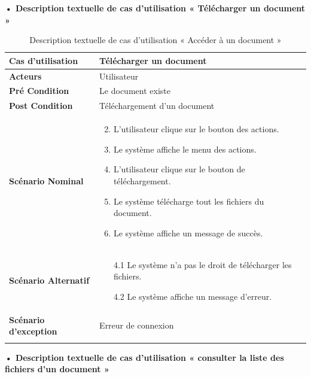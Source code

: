 \textbf{•	Description textuelle de cas d'utilisation « Télécharger un document »}

\begin{longtable}{|p{5cm}|p{10cm}|}
\hline
\textbf{Cas d'utilisation}& Télécharger un document\\
\hline
\textbf{Acteurs}&Utilisateur\\
\hline
\textbf{Pré Condition}&Le document existe\\
\hline
\textbf{Post Condition}&Téléchargement d'un document\\
\hline
\textbf{Scénario Nominal}&
\vspace{-\baselineskip}
\begin{enumerate}
    \setcounter{enumi}{1}
    \item L'utilisateur clique sur le bouton des actions.
    \item Le système affiche le menu des actions.
    \item L'utilisateur clique sur le bouton de téléchargement.
    \item Le système télécharge tout les fichiers du document.
    \item Le système affiche un message de succès.
\end{enumerate}\\
\hline
\textbf{Scénario Alternatif}&
\vspace{-\baselineskip}
\begin{enumerate}
  \item [4.1] Le système n'a pas le droit de télécharger les fichiers.
  \item [4.2] Le système affiche un message d'erreur.
\end{enumerate}\\
\hline
\textbf{Scénario d'exception}&Erreur de connexion\\
\hline
\caption{Description textuelle de cas d'utilisation « Accéder à un document »}
\label{tab:DescriptionTextuelleDeCasDUtilisationAccéderAUnDocument}
\end{longtable}


\textbf{•	Description textuelle de cas d'utilisation « consulter la liste des fichiers d'un document »}

